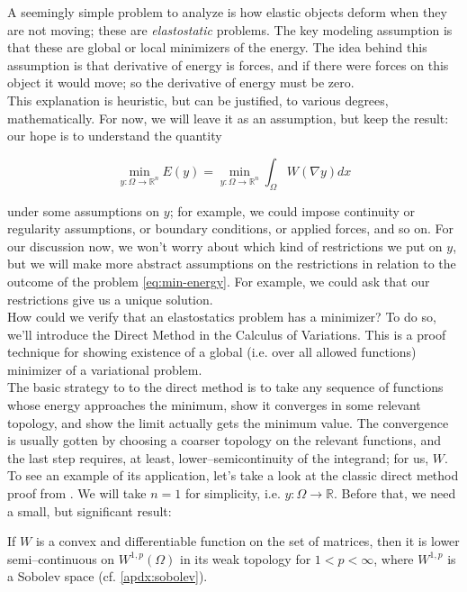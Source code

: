 \documentclass[../main.tex]{subfiles}
\begin{document}
A seemingly simple problem to analyze is how elastic objects deform when they are not moving; these are \emph{elastostatic} problems.
The key modeling assumption is that these are global or local minimizers of the energy.
The idea behind this assumption is that derivative of energy is forces, and if there were forces on this object it would move; so the derivative of energy must be zero. \\

This explanation is heuristic, but can be justified, to various degrees, mathematically.
For now, we will leave it as an assumption, but keep the result: our hope is to understand the quantity

\begin{equation}
	\label{eq:min-energy}
	\min_{y: \Omega \to \mathbb{R}^n} E(y) = \min_{y: \Omega \to \mathbb{R}^n} \int_{\Omega}W( \nabla y) dx
\end{equation}

under some assumptions on $y$; for example, we could impose continuity or regularity assumptions, or boundary conditions, or applied forces, and so on.
For our discussion now, we won't worry about which kind of restrictions we put on $y$, but we will make more abstract assumptions on the restrictions in relation to the outcome of the problem \eqref{eq:min-energy}.
For example, we could ask that our restrictions give us a unique solution. \\

How could we verify that an elastostatics problem has a minimizer? To do so, we'll introduce the Direct Method in the Calculus of Variations.
This is a proof technique for showing existence of a global (i.e. over all allowed functions) minimizer  of a variational problem. \\

The basic strategy to to the direct method is to take any sequence of functions whose energy approaches the minimum, show it converges in some relevant topology, and show the limit actually gets the minimum value.
The convergence is usually gotten by choosing a coarser topology on the relevant functions, and the last step requires, at least, lower--semicontinuity of the integrand; for us, $W$.
To see an example of its application, let's take a look at the classic direct method proof from \cite{evans_partial_2010}.
We will take $n=1$ for simplicity, i.e. $y: \Omega \to \mathbb{R}$.
Before that, we need a small, but significant result:

\begin{lem}
	If $W$ is a convex and differentiable function on the set of matrices, then it is lower semi--continuous on $W^{1,p}(\Omega)$ in its weak topology for $1 < p < \infty$, where $W^{1,p}$ is a Sobolev space (cf. \ref{apdx:sobolev}).
\end{lem}
\end{document}
